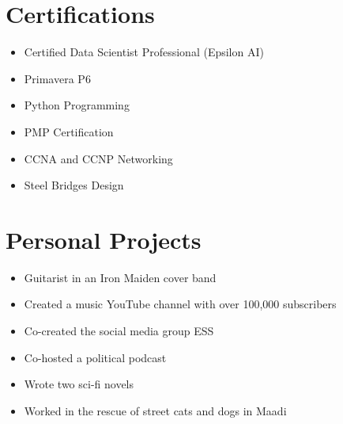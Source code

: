 \documentclass[10pt, letterpaper]{article}
\begin{document}
\begin{mdframed}[style=cvframe]
\begin{multicols}{2}
\section{Certifications}
\begin{itemize}[leftmargin=*]
    \item Certified Data Scientist Professional (Epsilon AI)
    \item Primavera P6
    \item Python Programming
    \item PMP Certification
    \item CCNA and CCNP Networking
    \item Steel Bridges Design
\end{itemize}

\section{Personal Projects}
\begin{itemize}[leftmargin=*]
    \item Guitarist in an Iron Maiden cover band
    \item Created a music YouTube channel with over 100,000 subscribers
    \item Co-created the social media group ESS
    \item Co-hosted a political podcast
    \item Wrote two sci-fi novels
    \item Worked in the rescue of street cats and dogs in Maadi
\end{itemize}

\end{multicols}
\end{mdframed}
\end{document}
